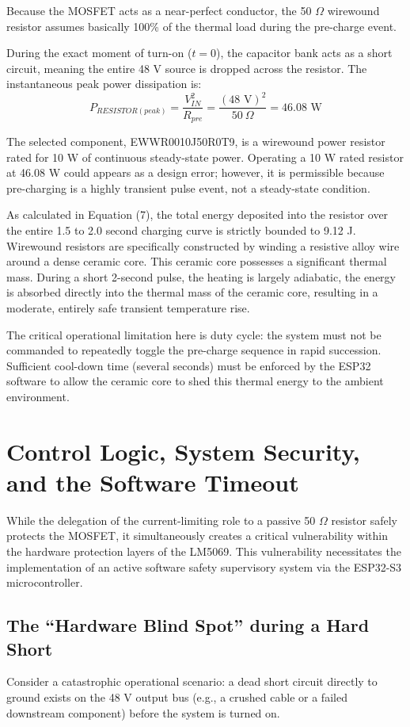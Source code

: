 \documentclass[11pt,a4paper]{article}
\begin{document}
Because the MOSFET acts as a near-perfect conductor, the 50 $\Omega$ wirewound resistor assumes basically 100\% of the thermal load during the pre-charge event. 

During the exact moment of turn-on ($t=0$), the capacitor bank acts as a short circuit, meaning the entire 48 V source is dropped across the resistor. The instantaneous peak power dissipation is:
\begin{equation}
P_{RESISTOR(peak)} = \frac{V_{IN}^2}{R_{pre}} = \frac{(48 \text{ V})^2}{50\ \Omega} = 46.08 \text{ W}
\end{equation}

The selected component, EWWR0010J50R0T9, is a wirewound power resistor rated for 10 W of continuous steady-state power. Operating a 10 W rated resistor at 46.08 W could appears as a design error; however, it is permissible because pre-charging is a highly transient pulse event, not a steady-state condition. 

As calculated in Equation (7), the total energy deposited into the resistor over the entire 1.5 to 2.0 second charging curve is strictly bounded to 9.12 J. Wirewound resistors are specifically constructed by winding a resistive alloy wire around a dense ceramic core. This ceramic core possesses a significant thermal mass. During a short 2-second pulse, the heating is largely adiabatic, the energy is absorbed directly into the thermal mass of the ceramic core, resulting in a moderate, entirely safe transient temperature rise. 

The critical operational limitation here is duty cycle: the system must not be commanded to repeatedly toggle the pre-charge sequence in rapid succession. Sufficient cool-down time (several seconds) must be enforced by the ESP32 software to allow the ceramic core to shed this thermal energy to the ambient environment.

\section{Control Logic, System Security, and the Software Timeout}

While the delegation of the current-limiting role to a passive 50 $\Omega$ resistor safely protects the MOSFET, it simultaneously creates a critical vulnerability within the hardware protection layers of the LM5069. This vulnerability necessitates the implementation of an active software safety supervisory system via the ESP32-S3 microcontroller.

\subsection{The ``Hardware Blind Spot'' during a Hard Short}
Consider a catastrophic operational scenario: a dead short circuit directly to ground exists on the 48 V output bus (e.g., a crushed cable or a failed downstream component) before the system is turned on.
\end{document}
